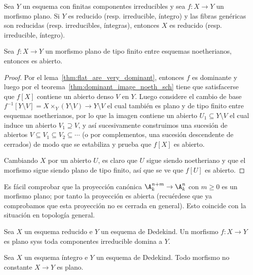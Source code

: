 \begin{prop}
	Sea $Y$ un esquema con finitas componentes irreducibles y sea $f\colon X \to Y$ un morfismo plano.
	Si $Y$ es reducido (resp. irreducible, íntegro) y las fibras genéricas son reducidas (resp. irreducibles, íntegras),
	entonces $X$ es reducido (resp. irreducible, íntegro).
\end{prop}

\begin{prop}\label{thm:flat_morph_open}
	Sea $f\colon X \to Y$ un morfismo plano de tipo finito entre esquemas noetherianos, entonces es abierto.
\end{prop}
\begin{proof}
	Por el lema~\ref{thm:flat_are_very_dominant}, entonces $f$ es dominante y luego por el teorema~\ref{thm:dominant_image_noeth_sch} tiene que
	satisfacerse que $f[X]$ contiene un abierto denso $V$ en $Y$.
	Luego considere el cambio de base $f^{-1}[Y \setminus V] = X \times_Y (Y \setminus V) \to Y \setminus V$ el cual también es plano y de tipo finito
	entre esquemas noetherianos, por lo que la imagen contiene un abierto $U_1 \subseteq Y \setminus V$ el cual induce un abierto $V_1 \supseteq V$,
	y así sucesivamente construimos una sucesión de abiertos $V \subseteq V_1 \subseteq V_2 \subseteq \cdots$ (o por complementos, una sucesión descendente
	de cerrados) de modo que se estabiliza y prueba que $f[X]$ es abierto.

	Cambiando $X$ por un abierto $U$, es claro que $U$ sigue siendo noetheriano y que el morfismo sigue siendo plano de tipo finito, así que se ve que $f[U]$
	es abierto.
\end{proof}
\begin{ex}
	Es fácil comprobar que la proyección canónica $\A^{n+m}_k \to \A^n_k$ con $m \ge 0$ es un morfismo plano;
	por tanto la proyección es abierta (recuérdese que ya comprobamos que esta proyección no es cerrada en general).
	Esto coincide con la situación en topología general.
\end{ex}

\begin{prop}
	Sea $X$ un esquema reducido e $Y$ un esquema de Dedekind.
	Un morfismo $f\colon X \to Y$ es plano syss toda componentes irreducible domina a $Y$.
\end{prop}
\begin{cor}
	Sea $X$ un esquema íntegro e $Y$ un esquema de Dedekind.
	Todo morfismo no constante $X \to Y$ es plano.
\end{cor}

